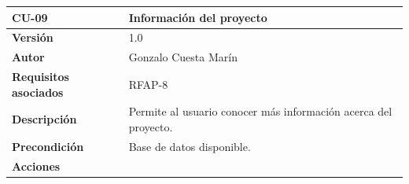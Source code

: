 \documentclass[
]{article}
\begin{document}
\begin{longtable}[]{@{}ll@{}}
\toprule
\begin{minipage}[b]{0.27\columnwidth}\raggedright
\textbf{CU-09}\strut
\end{minipage} & \begin{minipage}[b]{0.67\columnwidth}\raggedright
\textbf{Información del proyecto}\strut
\end{minipage}\tabularnewline
\midrule
\endhead
\begin{minipage}[t]{0.27\columnwidth}\raggedright
\textbf{Versión}\strut
\end{minipage} & \begin{minipage}[t]{0.67\columnwidth}\raggedright
1.0\strut
\end{minipage}\tabularnewline
\begin{minipage}[t]{0.27\columnwidth}\raggedright
\textbf{Autor}\strut
\end{minipage} & \begin{minipage}[t]{0.67\columnwidth}\raggedright
Gonzalo Cuesta Marín\strut
\end{minipage}\tabularnewline
\begin{minipage}[t]{0.27\columnwidth}\raggedright
\textbf{Requisitos asociados}\strut
\end{minipage} & \begin{minipage}[t]{0.67\columnwidth}\raggedright
RFAP-8\strut
\end{minipage}\tabularnewline
\begin{minipage}[t]{0.27\columnwidth}\raggedright
\textbf{Descripción}\strut
\end{minipage} & \begin{minipage}[t]{0.67\columnwidth}\raggedright
Permite al usuario conocer más información acerca del proyecto.\strut
\end{minipage}\tabularnewline
\begin{minipage}[t]{0.27\columnwidth}\raggedright
\textbf{Precondición}\strut
\end{minipage} & \begin{minipage}[t]{0.67\columnwidth}\raggedright
Base de datos disponible.\strut
\end{minipage}\tabularnewline
\begin{minipage}[t]{0.27\columnwidth}\raggedright
\textbf{Acciones}\strut
\end{minipage} & \begin{minipage}[t]{0.67\columnwidth}\raggedright
\begin{enumerate}

\end{enumerate}
\end{minipage}
\end{longtable}
\end{document}
